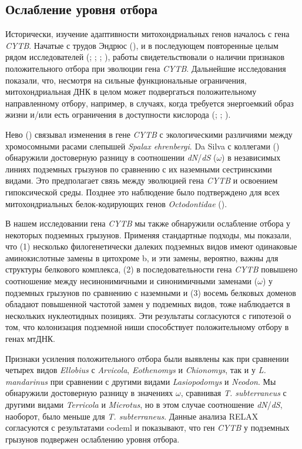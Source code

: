 \subsection{Ослабление уровня отбора}

Исторически, изучение адаптивности митохондриальных генов началось с гена \textit{CYTB}. Начатые с трудов Эндрюс (\cite{Andrews1998}), и в последующем повторенные целым рядом исследователей (\cite{Tomasco2014}; \cite{DaSilva2009}; \cite{DiRocco2006}; \cite{Shao2015}), работы свидетельствовали о наличии признаков положительного отбора при эволюции гена \textit{CYTB}. Дальнейшие исследования показали, что, несмотря на сильные функциональные ограничения, митохондриальная ДНК в целом может подвергаться положительному направленному отбору, например, в случаях, когда требуется энергоемкий образ жизни и/или есть ограничения в доступности кислорода (\cite{Tomasco2011}; \cite{Shen2010}; \cite{Blier2001}).

Нево (\cite{Nevo1999}) связывал изменения в гене \textit{CYTB} с экологическими различиями между хромосомными расами слепышей \textit{Spalax ehrenbergi}. Da Silva с коллегами (\cite{DaSilva2009}) обнаружили достоверную разницу в соотношении \textit{dN}/\textit{dS} ($\omega$) в независимых линиях подземных грызунов по сравнению с их наземными сестринскими видами. Это предполагает связь между эволюцией гена \textit{CYTB} и освоением гипоксической среды. Позднее это наблюдение было подтверждено для всех митохондриальных белок-кодирующих генов \textit{Octodontidae} (\cite{Tomasco2011}).

В нашем исследовании гена \textit{CYTB} мы также обнаружили ослабление отбора у некоторых подземных грызунов. Применяя стандартные подходы, мы показали, что (1) несколько филогенетически далеких подземных видов имеют одинаковые аминокислотные замены в цитохроме b, и эти замены, вероятно, важны для структуры белкового комплекса, (2) в последовательности гена \textit{CYTB} повышено соотношение между несинонимичными и синонимичными заменами ($\omega$) у подземных грызунов по сравнению с наземными и (3) восемь белковых доменов обладают повышенной частотой замен у подземных видов, тоже наблюдается в нескольких нуклеотидных позициях. Эти результаты согласуются с гипотезой о том, что колонизация подземной ниши способствует положительному отбору в генах мтДНК.

Признаки усиления положительного отбора были выявлены как при сравнении четырех видов \textit{Ellobius} с \textit{Arvicola}, \textit{Eothenomys} и \textit{Chionomys}, так и у \textit{L. mandarinus} при сравнении с другими видами \textit{Lasiopodomys} и \textit{Neodon}. Мы обнаружили достоверную разницу в значениях $\omega$, сравнивая \textit{T. subterraneus} с другими видами \textit{Terricola} и \textit{Microtus}, но в этом случае соотношение \textit{dN}/\textit{dS}, наоборот, было меньше для \textit{T. subterraneus}. Данные анализа RELAX согласуются с результатами codeml и показывают, что ген \textit{CYTB} у подземных грызунов подвержен ослаблению уровня отбора.


